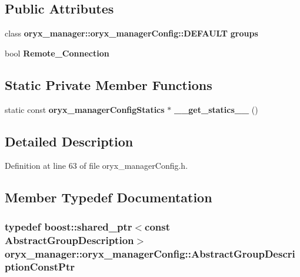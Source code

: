 \subsection*{\-Public \-Attributes}
\begin{DoxyCompactItemize}
\item 
class \*
{\bf oryx\-\_\-manager\-::oryx\-\_\-manager\-Config\-::\-D\-E\-F\-A\-U\-L\-T} {\bf groups}
\item 
bool {\bf \-Remote\-\_\-\-Connection}
\end{DoxyCompactItemize}
\subsection*{\-Static \-Private \-Member \-Functions}
\begin{DoxyCompactItemize}
\item 
static const \*
{\bf oryx\-\_\-manager\-Config\-Statics} $\ast$ {\bf \-\_\-\-\_\-get\-\_\-statics\-\_\-\-\_\-} ()
\end{DoxyCompactItemize}


\subsection{\-Detailed \-Description}


\-Definition at line 63 of file oryx\-\_\-manager\-Config.\-h.



\subsection{\-Member \-Typedef \-Documentation}
\subsubsection[{\-Abstract\-Group\-Description\-Const\-Ptr}]{\setlength{\rightskip}{0pt plus 5cm}typedef boost\-::shared\-\_\-ptr$<$const {\bf \-Abstract\-Group\-Description}$>$ {\bf oryx\-\_\-manager\-::oryx\-\_\-manager\-Config\-::\-Abstract\-Group\-Description\-Const\-Ptr}}\label{classoryx__manager_1_1oryx__managerConfig_a6fc911b2975d1dd9f07256e367634e10}


